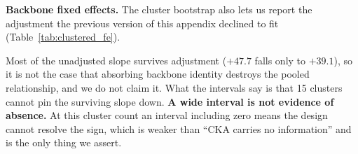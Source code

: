 \textbf{Backbone fixed effects.} The cluster bootstrap also lets us report the
adjustment the previous version of this appendix declined to fit
(Table~\ref{tab:clustered_fe}).

\begin{table}[!htbp]
\centering\footnotesize
\caption{Within-backbone slope of held-out B$-$D on CKA, in percentage points per
unit of CKA, with backbone identity absorbed as a fixed effect rather than by
subsetting. Intervals are $10{,}000$ cluster-bootstrap draws over the 15
$(\text{backbone}, \text{dataset})$ clusters of 31 cells; draws in which the fixed
effects are unidentified or the design is rank-deficient are discarded, and the
kept count is reported. Emitted by \texttt{scripts/clustered\_inference.py} from
\texttt{scripts/cka\_fixed\_effects.py}.}
\label{tab:clustered_fe}

\end{table}

Most of the unadjusted slope survives adjustment ($+47.7$ falls only to
$+39.1$), so it is not the case that absorbing backbone identity destroys the
pooled relationship, and we do not claim it. What the intervals say is that 15
clusters cannot pin the surviving slope down. \textbf{A wide interval is not
evidence of absence.} At this cluster count an interval including zero means the
design cannot resolve the sign, which is weaker than ``CKA carries no
information'' and is the only thing we assert.

